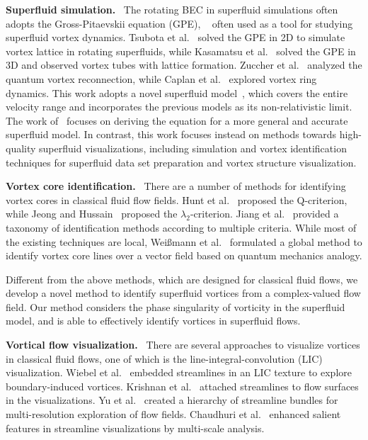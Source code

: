 \documentclass[10pt,journal,compsoc,twoside]{IEEEtran}
\newcommand{\rd}[1]{{\color[rgb]{0.0,0.0,0.0}{#1}}}
\begin{document}
	\vspace{0.15cm}
	\noindent
	\textbf{Superfluid simulation.} \
	The rotating BEC in superfluid simulations often adopts the Gross-Pitaevskii equation (GPE), \rd{which is a low-speed limit model}~\cite{Tsubota_02} often used as a tool for studying superfluid vortex dynamics. %
	Tsubota et al.~\cite{Tsubota_02} solved the GPE in 2D to simulate vortex lattice in rotating superfluids, while Kasamatsu et al.~\cite{Kasamatsu_PRA_05} solved the GPE in 3D and observed vortex tubes with lattice formation.
	Zuccher et al.~\cite{Zuccher_12} analyzed the quantum vortex reconnection, while Caplan et al.~\cite{NLSEmagic} explored vortex ring dynamics. 
	This work adopts a novel superfluid model~\cite{PRD_14}, which covers the entire velocity range and incorporates the previous models as its non-relativistic limit.
	The work of~\cite{PRD_14} focuses on deriving the equation for a more general and accurate superfluid model.
	In contrast, this work focuses instead on methods towards high-quality superfluid visualizations, including simulation and vortex identification techniques for superfluid data set preparation and vortex structure visualization.
	
	\vspace{0.2cm}
	\noindent
	\textbf{Vortex core identification.} \
	There are a number of methods for identifying vortex cores in classical fluid flow fields.
	Hunt et al.~\cite{Hunt_88} proposed the Q-criterion, while Jeong  and Hussain~\cite{Jeong_95} proposed the $\lambda_2$-criterion.
	Jiang et al.~\cite{Jiang_05} provided a taxonomy of identification methods according to multiple criteria.
	While most of the existing techniques are local, Wei\ss{}mann et al.~\cite{WeiBmann_14} formulated a global method to identify vortex core lines over a vector field based on quantum mechanics analogy.
	
	Different from the above methods, which are designed for classical fluid flows, we develop a novel method to identify superfluid vortices from a complex-valued flow field.
	Our method considers the phase singularity of vorticity in the superfluid model, and is able to effectively identify vortices in superfluid flows.
	
	
	
	
	\vspace{0.15cm}
	\noindent
	\textbf{Vortical flow visualization.} \
	There are several approaches to visualize vortices in classical fluid flows, one of which is the line-integral-convolution (LIC) visualization.
	Wiebel et al.~\cite{Wiebel_07} embedded streamlines in an LIC texture to explore boundary-induced vortices.
	Krishnan et al.~\cite{Krishnan_09} attached streamlines to flow surfaces in the visualizations.
	Yu et al.~\cite{Yu_12} created a hierarchy of streamline bundles for multi-resolution exploration of flow fields. 
	Chaudhuri et al.~\cite{Chaudhuri_14} enhanced salient features in streamline visualizations by multi-scale analysis.
	
\end{document}
